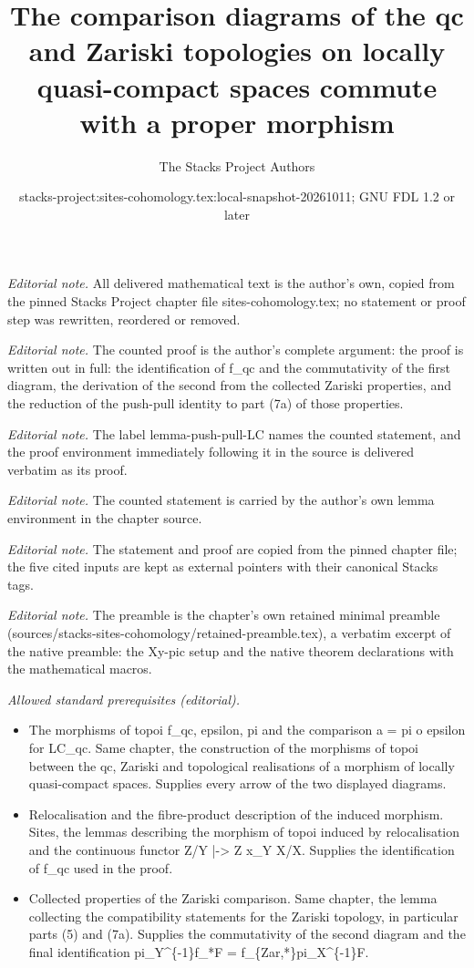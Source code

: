 \documentclass[10pt,a4paper]{amsart}
\title{The comparison diagrams of the qc and Zariski topologies on locally quasi-compact spaces commute with a proper morphism}
\author{The Stacks Project Authors}
\date{stacks-project:sites-cohomology.tex:local-snapshot-20261011; GNU FDL 1.2 or later}
\theoremstyle{plain}
\theoremstyle{definition}
\theoremstyle{remark}
\numberwithin{equation}{subsection}
\begin{document}
\maketitle
\noindent\textit{Editorial note.} All delivered mathematical text is the author's own, copied from the pinned Stacks Project chapter file sites-cohomology.tex; no statement or proof step was rewritten, reordered or removed.\par\medskip
\noindent\textit{Editorial note.} The counted proof is the author's complete argument: the proof is written out in full: the identification of f\_qc and the commutativity of the first diagram, the derivation of the second from the collected Zariski properties, and the reduction of the push-pull identity to part (7a) of those properties.\par\medskip
\noindent\textit{Editorial note.} The label lemma-push-pull-LC names the counted statement, and the proof environment immediately following it in the source is delivered verbatim as its proof.\par\medskip
\noindent\textit{Editorial note.} The counted statement is carried by the author's own lemma environment in the chapter source.\par\medskip
\noindent\textit{Editorial note.} The statement and proof are copied from the pinned chapter file; the five cited inputs are kept as external pointers with their canonical Stacks tags.\par\medskip
\noindent\textit{Editorial note.} The preamble is the chapter's own retained minimal preamble (sources/stacks-sites-cohomology/retained-preamble.tex), a verbatim excerpt of the native preamble: the Xy-pic setup and the native theorem declarations with the mathematical macros.\par\medskip
\noindent\textit{Allowed standard prerequisites (editorial).}\begin{itemize}
\item The morphisms of topoi f\_qc, epsilon, pi and the comparison a = pi o epsilon for LC\_qc. Same chapter, the construction of the morphisms of topoi between the qc, Zariski and topological realisations of a morphism of locally quasi-compact spaces. Supplies every arrow of the two displayed diagrams.
\item Relocalisation and the fibre-product description of the induced morphism. Sites, the lemmas describing the morphism of topoi induced by relocalisation and the continuous functor Z/Y |-> Z x\_Y X/X. Supplies the identification of f\_qc used in the proof.
\item Collected properties of the Zariski comparison. Same chapter, the lemma collecting the compatibility statements for the Zariski topology, in particular parts (5) and (7a). Supplies the commutativity of the second diagram and the final identification pi\_Y\textasciicircum{}\{-1\}f\_*F = f\_\{Zar,*\}pi\_X\textasciicircum{}\{-1\}F.
\end{itemize}\medskip
\end{document}
